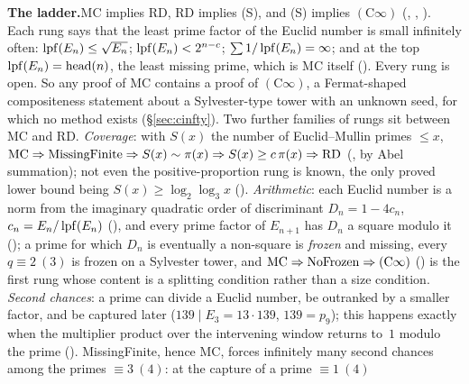 \begin{frontierbox}[title={\sffamily\bfseries The ladder, and what a route must pass}]
\textbf{The ladder.}\enspace MC implies RD, RD implies (S), and (S)
implies $(\mathrm{C}\infty)$
(,
,
).
Each rung says that the least prime factor of the Euclid number is
small infinitely often: $\operatorname{lpf}(E_n) \le \sqrt{E_n}$; $\operatorname{lpf}(E_n) <
2^{n-c}$; $\sum 1/\operatorname{lpf}(E_n) = \infty$; and at the top $\operatorname{lpf}(E_n) =
\mathrm{head}(n)$, the least missing prime, which is MC itself
().
Every rung is open.  So any proof of MC contains a proof of
$(\mathrm{C}\infty)$, a Fermat-shaped compositeness statement about a
Sylvester-type tower with an unknown seed, for which no method exists
(\S\ref{sec:cinfty}).  Two further families of rungs sit between MC
and RD.  \emph{Coverage}: with $S(x)$ the number of Euclid--Mullin
primes $\le x$,
$\mathrm{MC}\Rightarrow\mathrm{MissingFinite}\Rightarrow S(x)\sim\pi(x)
\Rightarrow S(x)\ge c\,\pi(x)\Rightarrow\mathrm{RD}$
(, by Abel
summation); not even the positive-proportion rung is known, the only
proved lower bound being $S(x)\ge\log_2\log_3 x$
().
\emph{Arithmetic}: each Euclid number is a norm from the imaginary
quadratic order of discriminant $D_n=1-4c_n$, $c_n=E_n/\operatorname{lpf}(E_n)$
(), and
every prime factor of $E_{n+1}$ has $D_n$ a square modulo it
(); a
prime for which $D_n$ is eventually a non-square is \emph{frozen} and
missing, every $q\equiv2\ (3)$ is frozen on a Sylvester tower, and
$\mathrm{MC}\Rightarrow\mathrm{NoFrozen}\Rightarrow(\mathrm C\infty)$
() is the first rung
whose content is a splitting condition rather than a size condition.
\emph{Second chances}: a prime can divide a Euclid number, be outranked
by a smaller factor, and be captured later ($139 \mid E_3 = 13\cdot 139$,
$139 = p_9$); this happens exactly when the multiplier product over the
intervening window returns to~$1$ modulo the prime
().
MissingFinite, hence MC, forces infinitely many second chances among
the primes $\equiv 3\ (4)$: at the capture of a prime $\equiv 1\ (4)$

\end{frontierbox}
